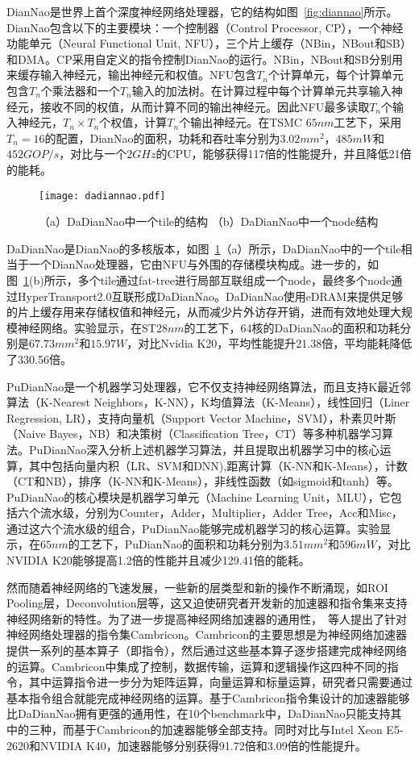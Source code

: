 DianNao是世界上首个深度神经网络处理器，它的结构如图~\ref{fig:diannao}所示。DianNao包含以下的主要模块：一个控制器（Control Processor, CP），一个神经功能单元（Neural Functional Unit, NFU），三个片上缓存（NBin，NBout和SB）和DMA。CP采用自定义的指令控制DianNao的运行。NBin，NBout和SB分别用来缓存输入神经元，输出神经元和权值。NFU包含$T_n$个计算单元，每个计算单元包含$T_n$个乘法器和一个$T_n$输入的加法树。在计算过程中每个计算单元共享输入神经元，接收不同的权值，从而计算不同的输出神经元。因此NFU最多读取$T_n$个输入神经元，$T_n\times T_n$个权值，计算$T_n$个输出神经元。在TSMC $65nm$工艺下，采用$T_n=16$的配置，DianNao的面积，功耗和吞吐率分别为$3.02mm^2$，$485mW$和$452GOP/s$，对比与一个$2GHz$的CPU，能够获得117倍的性能提升，并且降低21倍的能耗。

\begin{figure}[h]
  \centering
  \texttt{[image: dadiannao.pdf]}
  \caption{\footnotesize （a）DaDianNao中一个tile的结构 （b）DaDianNao中一个node结构}
  \label{fig:dadiannao}
\end{figure}

DaDianNao是DianNao的多核版本，如图~\ref{fig:dadiannao}（a）所示，DaDianNao中的一个tile相当于一个DianNao处理器，它由NFU与外围的存储模块构成。进一步的，如图~\ref{fig:dadiannao}(b)所示，多个tile通过fat-tree进行局部互联组成一个node，最终多个node通过HyperTransport2.0互联形成DaDianNao。DaDianNao使用eDRAM来提供足够的片上缓存用来存储权值和神经元，从而减少片外访存开销，进而有效地处理大规模神经网络。实验显示，在ST$28nm$的工艺下，64核的DaDianNao的面积和功耗分别是$67.73mm^2$和$15.97W$，对比Nvidia K20，平均性能提升21.38倍，平均能耗降低了330.56倍。

PuDianNao是一个机器学习处理器，它不仅支持神经网络算法，而且支持K最近邻算法（K-Nearest Neighbors，K-NN），K均值算法（K-Means），线性回归（Liner Regression, LR），支持向量机（Support Vector Machine，SVM），朴素贝叶斯（Naive Bayes，NB）和决策树（Classification Tree，CT）等多种机器学习算法。PuDianNao深入分析上述机器学习算法，并且提取出机器学习中的核心运算，其中包括向量内积（LR、SVM和DNN),距离计算（K-NN和K-Means），计数（CT和NB），排序（K-NN和K-Means），非线性函数（如sigmoid和tanh）等。PuDianNao的核心模块是机器学习单元（Machine Learning Unit，MLU），它包括六个流水级，分别为Counter，Adder，Multiplier，Adder Tree，Acc和Misc，通过这六个流水级的组合，PuDianNao能够完成机器学习的核心运算。实验显示，在$65nm$的工艺下，PuDianNao的面积和功耗分别为$3.51mm^2$和$596mW$，对比NVIDIA K20能够提高1.2倍的性能并且减少129.41倍的能耗。

然而随着神经网络的飞速发展，一些新的层类型和新的操作不断涌现，如ROI Pooling层，Deconvolution层等，这又迫使研究者开发新的加速器和指令集来支持神经网络新的特性。为了进一步提高神经网络加速器的通用性，~\citet{liu2016cambricon}等人提出了针对神经网络处理器的指令集Cambricon。Cambricon的主要思想是为神经网络加速器提供一系列的基本算子（即指令），然后通过这些基本算子逐步搭建完成神经网络的运算。Cambricon中集成了控制，数据传输，运算和逻辑操作这四种不同的指令，其中运算指令进一步分为矩阵运算，向量运算和标量运算，研究者只需要通过基本指令组合就能完成神经网络的运算。基于Cambricon指令集设计的加速器能够比DaDianNao拥有更强的通用性，在10个benchmark中，DaDianNao只能支持其中的三种，而基于Cambricon的加速器能够全部支持。同时对比与Intel Xeon E5-2620和NVIDIA K40，加速器能够分别获得91.72倍和3.09倍的性能提升。

